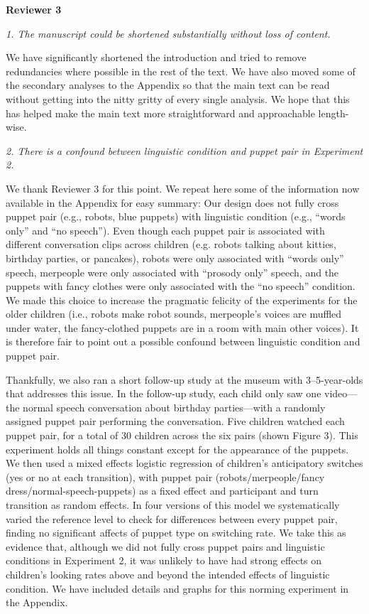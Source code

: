 \documentclass[11pt,a4paper]{letter} %
\begin{document}
\begin{letter}{}
\bigskip

\noindent \textbf{Reviewer 3}

\noindent \textit{1. The manuscript could be shortened substantially without loss of content.}

\noindent We have significantly shortened the introduction and tried to remove redundancies where possible in the rest of the text. We have also moved some of the secondary analyses to the Appendix so that the main text can be read without getting into the nitty gritty of every single analysis. We hope that this has helped make the main text more straightforward and approachable length-wise.

\smallskip

\noindent \textit{2. There is a confound between linguistic condition and puppet pair in Experiment 2.}

\noindent We thank Reviewer 3 for this point. We repeat here some of the information now available in the Appendix for easy summary: Our design does not fully cross puppet pair (e.g., robots, blue puppets) with linguistic condition (e.g., ``words only'' and ``no speech''). Even though each puppet pair is associated with different conversation clips across children (e.g. robots talking about kitties, birthday parties, or pancakes), robots were only associated with ``words only'' speech, merpeople were only associated with ``prosody only'' speech, and the puppets with fancy clothes were only associated with the ``no speech'' condition. We made this choice to increase the pragmatic felicity of the experiments for the older children (i.e., robots make robot sounds, merpeople's voices are muffled under water, the fancy-clothed puppets are in a room with main other voices). It is therefore fair to point out a possible confound between linguistic condition and puppet pair. 

Thankfully, we also ran a short follow-up study at the museum with 3--5-year-olds that addresses this issue. In the follow-up study, each child only saw one video---the normal speech conversation about birthday parties---with a randomly assigned puppet pair performing the conversation. Five children watched each puppet pair, for a total of 30 children across the six pairs (shown Figure 3). This experiment holds all things constant except for the appearance of the puppets. We then used a mixed effects logistic regression of children's anticipatory switches (yes or no at each transition), with puppet pair (robots/merpeople/fancy dress/normal-speech-puppets) as a fixed effect and participant and turn transition as random effects. In four versions of this model we systematically varied the reference level to check for differences between every puppet pair, finding no significant affects of puppet type on switching rate. We take this as evidence that, although we did not fully cross puppet pairs and linguistic conditions in Experiment 2, it was unlikely to have had strong effects on children's looking rates above and beyond the intended effects of linguistic condition. We have included details and graphs for this norming experiment in the Appendix. 


\end{letter}
\end{document}
